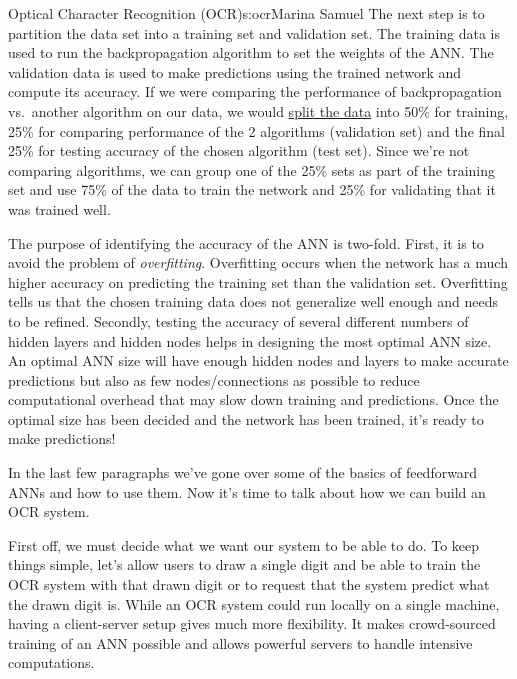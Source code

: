 \begin{aosachapter}{Optical Character Recognition (OCR)}{s:ocr}{Marina Samuel}
The next step is to partition the data set into a training set and
validation set. The training data is used to run the backpropagation
algorithm to set the weights of the ANN. The validation data is used to
make predictions using the trained network and compute its accuracy. If
we were comparing the performance of backpropagation vs.~another
algorithm on our data, we would
\href{http://www-group.slac.stanford.edu/sluo/Lectures/stat_lecture_files/sluo2006lec7.pdf}{split
the data} into 50\% for training, 25\% for comparing performance of the
2 algorithms (validation set) and the final 25\% for testing accuracy of
the chosen algorithm (test set). Since we're not comparing algorithms,
we can group one of the 25\% sets as part of the training set and use
75\% of the data to train the network and 25\% for validating that it
was trained well.

The purpose of identifying the accuracy of the ANN is two-fold. First,
it is to avoid the problem of \emph{overfitting}. Overfitting occurs
when the network has a much higher accuracy on predicting the training
set than the validation set. Overfitting tells us that the chosen
training data does not generalize well enough and needs to be refined.
Secondly, testing the accuracy of several different numbers of hidden
layers and hidden nodes helps in designing the most optimal ANN size. An
optimal ANN size will have enough hidden nodes and layers to make
accurate predictions but also as few nodes/connections as possible to
reduce computational overhead that may slow down training and
predictions. Once the optimal size has been decided and the network has
been trained, it's ready to make predictions!

\label{design-decisions-in-a-simple-ocr-system}

\label{sec.ocr.decisions}

In the last few paragraphs we've gone over some of the basics of
feedforward ANNs and how to use them. Now it's time to talk about how we
can build an OCR system.

First off, we must decide what we want our system to be able to do. To
keep things simple, let's allow users to draw a single digit and be able
to train the OCR system with that drawn digit or to request that the
system predict what the drawn digit is. While an OCR system could run
locally on a single machine, having a client-server setup gives much
more flexibility. It makes crowd-sourced training of an ANN possible and
allows powerful servers to handle intensive computations.


\end{aosachapter}
